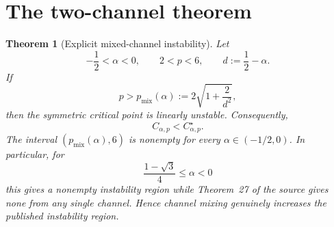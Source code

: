 \documentclass[11pt]{article}
\newtheorem{theorem}{Theorem}
\begin{document}
\clearpage
\section{The two-channel theorem}

\begin{theorem}[Explicit mixed-channel instability]\label{thm:main}
Let
\[
 -\frac12<\alpha<0,
 \qquad 2<p<6,
 \qquad d:=\frac12-\alpha.
\]
If
\begin{equation}\label{eq:threshold}
 p>p_{\mathrm{mix}}(\alpha)
 :=2\sqrt{1+\frac{2}{d^2}},
\end{equation}
then the symmetric critical point is linearly unstable.  Consequently,
\[
 C_{\alpha,p}<C^\star_{\alpha,p}.
\]
The interval $(p_{\mathrm{mix}}(\alpha),6)$ is nonempty for every
$\alpha\in(-1/2,0)$.  In particular, for
\[
 \frac{1-\sqrt3}{4}\leq\alpha<0
\]
this gives a nonempty instability region while Theorem~27 of the source gives
none from any single channel.  Hence channel mixing genuinely increases the
published instability region.
\end{theorem}
\end{document}
